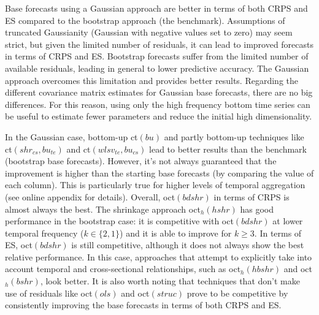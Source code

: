 \documentclass[12pt]{article}
\theoremstyle{definition}
\begin{document}
Base forecasts using a Gaussian approach are better in terms of both CRPS and ES compared to the bootstrap approach (the benchmark). Assumptions of truncated Gaussianity (Gaussian with negative values set to zero) may seem strict, but given the limited number of residuals, it can lead to improved forecasts in terms of CRPS and ES. Bootstrap forecasts suffer from the limited number of available residuals, leading in general to lower predictive accuracy. The Gaussian approach overcomes this limitation and provides better results. Regarding the different covariance matrix estimates for Gaussian base forecasts, there are no big differences. For this reason, using only the high frequency bottom time series can be useful to estimate fewer parameters and reduce the initial high dimensionality.

In the Gaussian case, bottom-up ct$(bu)$ and partly bottom-up techniques like ct$(shr_{cs}, bu_{te})$ and ct$(wlsv_{te}, bu_{cs})$ lead to better results than the benchmark (bootstrap base forecasts). However, it's not always guaranteed that the improvement is higher than the starting base forecasts (by comparing the value of each column). This is particularly true for higher levels of temporal aggregation (see online appendix for details). Overall, oct$(bdshr)$ in terms of CRPS is almost always the best. The shrinkage approach oct$_h(hshr)$ has good performance in the bootstrap case: it is competitive with oct$(bdshr)$ at lower temporal frequency ($k \in \{2,1\}$) and it is able to improve for $k\ge 3$. In terms of ES, oct$(bdshr)$ is still competitive, although it does not always show the best relative performance. In this case, approaches that attempt to explicitly take into account temporal and cross-sectional relationships, such as oct$_h(hbshr)$ and oct$_h(bshr)$, look better. It is also worth noting that techniques that don't make use of residuals like oct$(ols)$ and oct$(struc)$ prove to be competitive by consistently improving the base forecasts in terms of both CRPS and ES.
\end{document}
